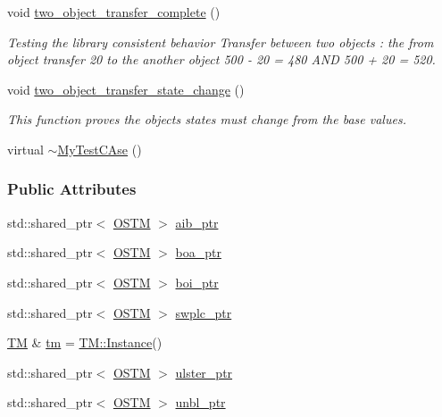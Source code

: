 \begin{DoxyCompactItemize}
void \hyperlink{class_my_test_c_ase_a6399ca8bca3f10a0f114a070d3e3a570_a6399ca8bca3f10a0f114a070d3e3a570}{two\+\_\+object\+\_\+transfer\+\_\+complete} ()
\begin{DoxyCompactList}\small\item\em Testing the library consistent behavior Transfer between two objects \+: the from object transfer 20 to the another object 500 -\/ 20 = 480 A\+ND 500 + 20 = 520. \end{DoxyCompactList}\item 
void \hyperlink{class_my_test_c_ase_ab9c76eb2dfd565a353ae9a5f604b36d9_ab9c76eb2dfd565a353ae9a5f604b36d9}{two\+\_\+object\+\_\+transfer\+\_\+state\+\_\+change} ()
\begin{DoxyCompactList}\small\item\em This function proves the objects states must change from the base values. \end{DoxyCompactList}\item 
virtual \hyperlink{class_my_test_c_ase_a6e57067745a7e72a8073c945e0266c56_a6e57067745a7e72a8073c945e0266c56}{$\sim$\+My\+Test\+C\+Ase} ()
\end{DoxyCompactItemize}
\subsubsection*{Public Attributes}
\begin{DoxyCompactItemize}
\item 
std\+::shared\+\_\+ptr$<$ \hyperlink{class_o_s_t_m}{O\+S\+TM} $>$ \hyperlink{class_my_test_c_ase_adad50e8278b64aa0321000b528e5362c_adad50e8278b64aa0321000b528e5362c}{aib\+\_\+ptr}
\item 
std\+::shared\+\_\+ptr$<$ \hyperlink{class_o_s_t_m}{O\+S\+TM} $>$ \hyperlink{class_my_test_c_ase_ae0b2db5d35e25b3139beeda0705494f0_ae0b2db5d35e25b3139beeda0705494f0}{boa\+\_\+ptr}
\item 
std\+::shared\+\_\+ptr$<$ \hyperlink{class_o_s_t_m}{O\+S\+TM} $>$ \hyperlink{class_my_test_c_ase_a5554de9e3e6393a89c66c036c529720b_a5554de9e3e6393a89c66c036c529720b}{boi\+\_\+ptr}
\item 
std\+::shared\+\_\+ptr$<$ \hyperlink{class_o_s_t_m}{O\+S\+TM} $>$ \hyperlink{class_my_test_c_ase_aa8ccae9a5a7feb5bc47591c55a82d0cd_aa8ccae9a5a7feb5bc47591c55a82d0cd}{swplc\+\_\+ptr}
\item 
\hyperlink{class_t_m}{TM} \& \hyperlink{class_my_test_c_ase_a422e6e5d4ddedea384be96031c89b72b_a422e6e5d4ddedea384be96031c89b72b}{tm} = \hyperlink{class_t_m_a7ce5f35e0dae76df4fe116cf905bbe60_a7ce5f35e0dae76df4fe116cf905bbe60}{T\+M\+::\+Instance}()
\item 
std\+::shared\+\_\+ptr$<$ \hyperlink{class_o_s_t_m}{O\+S\+TM} $>$ \hyperlink{class_my_test_c_ase_a4f9f72374d3d15be7cdf16412c4d7ed3_a4f9f72374d3d15be7cdf16412c4d7ed3}{ulster\+\_\+ptr}
\item 
std\+::shared\+\_\+ptr$<$ \hyperlink{class_o_s_t_m}{O\+S\+TM} $>$ \hyperlink{class_my_test_c_ase_a0ca634b597d6c0e136d632268853d5a7_a0ca634b597d6c0e136d632268853d5a7}{unbl\+\_\+ptr}
\end{DoxyCompactItemize}
